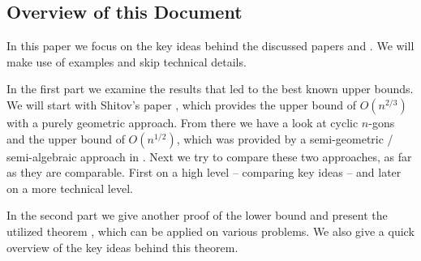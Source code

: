 \subsection{Overview of this Document}

In this paper we focus on the key ideas behind the discussed papers \cite{shitov2020sublinear} and \cite{kwan2020extension}. We will make use of examples and skip technical details.

In the first part we examine the results that led to the best known upper bounds. 
We will start with Shitov's paper \cite{shitov2020sublinear}, which provides the upper bound of $O(n^{2/3})$ with a purely geometric approach.
From there we have a look at cyclic $n$-gons and the upper bound of $O(n^{1/2})$, which was provided by a semi-geometric / semi-algebraic approach in \cite{kwan2020extension}.
Next we try to compare these two approaches, as far as they are comparable. First on a high level -- comparing key ideas -- and later on a more technical level.

In the second part we give another proof of the lower bound and present the utilized theorem \cite[Theorem 1]{averkov2016maximum}, which can be applied on various problems. We also give a quick overview of the key ideas behind this theorem.
